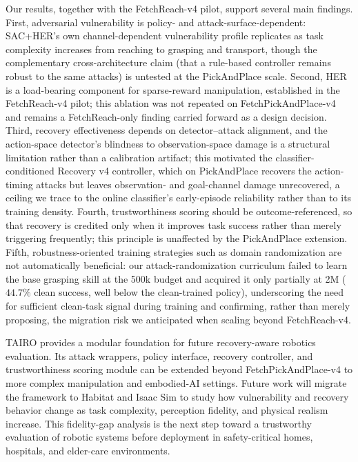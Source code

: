 \documentclass[conference]{IEEEtran}
\begin{document}
Our results, together with the FetchReach-v4 pilot, support several main findings.
First, adversarial vulnerability is policy- and attack-surface-dependent: SAC+HER's
own channel-dependent vulnerability profile replicates as task complexity increases
from reaching to grasping and transport, though the complementary cross-architecture
claim (that a rule-based controller remains robust to the same attacks) is untested at
the PickAndPlace scale. Second, HER is a load-bearing component for sparse-reward
manipulation, established in the FetchReach-v4 pilot; this ablation was not repeated on
FetchPickAndPlace-v4 and remains a FetchReach-only finding carried forward as a design
decision. Third, recovery effectiveness depends on detector--attack alignment, and the
action-space detector's blindness to observation-space damage is a structural
limitation rather than a calibration artifact; this motivated the classifier-conditioned
Recovery v4 controller, which on PickAndPlace recovers the action-timing attacks but
leaves observation- and goal-channel damage unrecovered, a ceiling we trace to the
online classifier's early-episode reliability rather than to its training density. Fourth, trustworthiness scoring should be outcome-referenced,
so that recovery is credited only when it improves task success rather than merely
triggering frequently; this principle is unaffected by the PickAndPlace extension.
Fifth, robustness-oriented training strategies such as domain randomization are not
automatically beneficial: our attack-randomization curriculum failed to learn the base
grasping skill at the 500k budget and acquired it only partially at 2M ($44.7\%$ clean
success, well below the clean-trained policy), underscoring the need for sufficient
clean-task signal during training and confirming, rather than merely proposing, the
migration risk we anticipated when scaling beyond FetchReach-v4.

TAIRO provides a modular foundation for future recovery-aware robotics evaluation. Its
attack wrappers, policy interface, recovery controller, and trustworthiness scoring
module can be extended beyond FetchPickAndPlace-v4 to more complex manipulation and
embodied-AI settings. Future work will migrate the framework to Habitat and Isaac Sim
to study how vulnerability and recovery behavior change as task complexity, perception
fidelity, and physical realism increase. This fidelity-gap analysis is the next step toward a trustworthy
evaluation of robotic systems before deployment in safety-critical homes, hospitals,
and elder-care environments.
\end{document}
